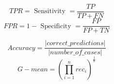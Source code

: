 \documentclass{article}
\begin{document}

\begin{equation}
TPR=\text { Sensitivity }=\frac{T P}{T P+F N}
\label{tpr}
\end{equation}
\begin{equation}
FPR=1-\text { Specificity }=\frac{F P}{F P+T N}
\label{fpr}
\end{equation}



\begin{equation}
  Accuracy= \frac{|correct\_predictions|}{|number\_of\_cases|}
  \label{eqn:acc}
\end{equation}
\begin{equation}
  G-mean%
  = \left (\prod_{i=1}^{n}{rec_{i}} \right )^{\frac{1}{n}}
  \label{gm}
\end{equation}
\end{document}

